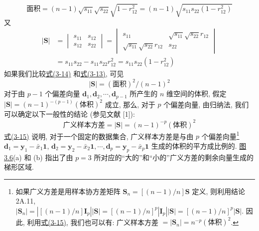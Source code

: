 \label{eq:3-13}
\begin{equation}
\text{面积}=(n-1)\sqrt{s_{11}}\sqrt{s_{22}}\sqrt{1-r_{12}^{2}}=(n-1)\sqrt{s_{11}s_{22}(1-r_{12}^{2})}
\tag{3-13}
\end{equation}
又
\label{eq:3-14}
\begin{equation}
\begin{aligned}
|\mathbf{S}|&=\begin{vmatrix}s_{11}&s_{12}\\s_{12}&s_{22}\end{vmatrix}
=\begin{vmatrix}s_{11}&\sqrt{s_{11}}\sqrt{s_{22}}r_{12}\\[4pt]\sqrt{s_{11}}\sqrt{s_{22}}r_{12}&s_{22}\end{vmatrix}\\[6pt]
&=s_{11}s_{22}-s_{11}s_{22}r_{12}^{2}=s_{11}s_{22}(1-r_{12}^{2})
\end{aligned}
\tag{3-14}
\end{equation}
如果我们比较\hyperref[eq:3-14]{式(3-14)} 和\hyperref[eq:3-13]{式(3-13)}, 可见
\[
|\mathbf{S}|=(\text{面积})^{2}/(n-1)^{2}
\]
对于由 $p-1$ 个偏差向量 $\mathbf{d}_{1},\mathbf{d}_{2},\cdots,\mathbf{d}_{p-1}$ 所产生的 $n$ 维空间的体积, 假定 $|\mathbf{S}|=(n-1)^{-(p-1)}(\text{体积})^{2}$ 成立, 那么, 对于 $p$ 个偏差向量, 由归纳法, 我们可以确定以下一般性的结论 (参见文献 [1]):
\label{eq:3-15}
\begin{equation}
\text{广义样本方差}=|\mathbf{S}|=(n-1)^{-p}(\text{体积})^{2}
\tag{3-15}
\end{equation}
\hyperref[eq:3-15]{式(3-15)} 说明, 对于一个固定的数据集合, 广义样本方差是与由 $p$ 个偏差向量\footnote{如果广义方差是用样本协方差矩阵 $\mathbf{S}_{n}=[(n-1)/n]\mathbf{S}$ 定义, 则利用结论 2A.11, $|\mathbf{S}_{n}|=|[(n-1)/n]\mathbf{I}_{p}||\mathbf{S}|=[(n-1)/n]^{p}|\mathbf{I}_{p}||\mathbf{S}|=[(n-1)/n]^{p}|\mathbf{S}|$. 因此, 利用\hyperref[eq:3-15]{式(3-15)}, 我们也可以有: 广义样本方差 $=|\mathbf{S}_{n}|=n^{-p}(\text{体积})^{2}$.} $\mathbf{d}_{1}=\mathbf{y}_{1}-\bar{x}_{1}\mathbf{1}$, $\mathbf{d}_{2}=\mathbf{y}_{2}-\bar{x}_{2}\mathbf{1},\cdots,\mathbf{d}_{p}=\mathbf{y}_{p}-\bar{x}_{p}\mathbf{1}$ 生成的体积的平方成比例的. \hyperref[fig:3.6]{图 3.6}(a) 和 (b) 指出了由 $p=3$ 所对应的“大的”和“小的”广义方差的剩余向量生成的梯形区域.

